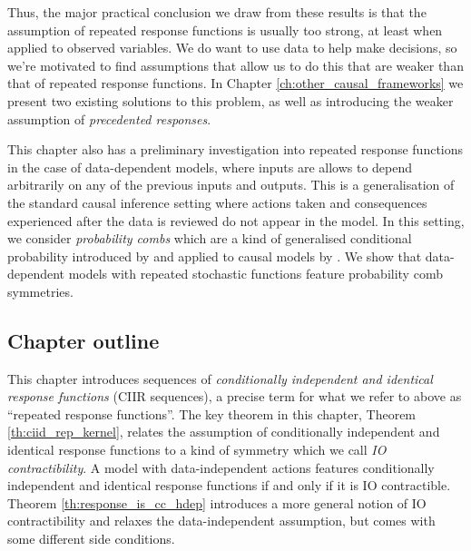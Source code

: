 Thus, the major practical conclusion we draw from these results is that the assumption of repeated response functions is usually too strong, at least when applied to observed variables. We do want to use data to help make decisions, so we're motivated to find assumptions that allow us to do this that are weaker than that of repeated response functions. In Chapter \ref{ch:other_causal_frameworks} we present two existing solutions to this problem, as well as introducing the weaker assumption of \emph{precedented responses}.

This chapter also has a preliminary investigation into repeated response functions in the case of data-dependent models, where inputs are allows to depend arbitrarily on any of the previous inputs and outputs. This is a generalisation of the standard causal inference setting where actions taken and consequences experienced after the data is reviewed do not appear in the model. In this setting, we consider \emph{probability combs} which are a kind of generalised conditional probability introduced by \citet{chiribella_quantum_2008} and applied to causal models by \citet{jacobs_causal_2019}. We show that data-dependent models with repeated stochastic functions feature probability comb symmetries. 

\subsection{Chapter outline}

This chapter introduces sequences of \emph{conditionally independent and identical response functions} (CIIR sequences), a precise term for what we refer to above as ``repeated response functions''. The key theorem in this chapter, Theorem \ref{th:ciid_rep_kernel}, relates the assumption of conditionally independent and identical response functions to a kind of symmetry which we call \emph{IO contractibility}. A model with data-independent actions features conditionally independent and identical response functions if and only if it is IO contractible. Theorem \ref{th:response_is_cc_hdep} introduces a more general notion of IO contractibility and relaxes the data-independent assumption, but comes with some different side conditions.

